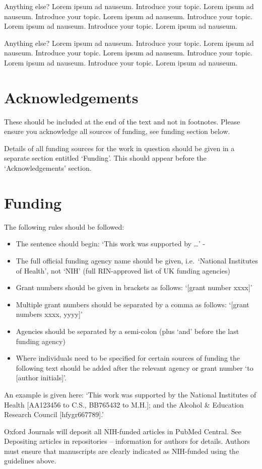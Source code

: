 \documentclass{bioinfo}
\providecommand{\tightlist}{%
  \setlength{\itemsep}{0pt}\setlength{\parskip}{0pt}}
\begin{document}
Anything else? Lorem ipsum ad nauseum. Introduce your topic. Lorem ipsum
ad nauseum. Introduce your topic. Lorem ipsum ad nauseum. Introduce your
topic. Lorem ipsum ad nauseum. Introduce your topic. Lorem ipsum ad
nauseum.

Anything else? Lorem ipsum ad nauseum. Introduce your topic. Lorem ipsum
ad nauseum. Introduce your topic. Lorem ipsum ad nauseum. Introduce your
topic. Lorem ipsum ad nauseum. Introduce your topic. Lorem ipsum ad
nauseum.

\section*{Acknowledgements}

These should be included at the end of the text and not in footnotes.
Please ensure you acknowledge all sources of funding, see funding
section below.

Details of all funding sources for the work in question should be given
in a separate section entitled `Funding'. This should appear before the
`Acknowledgements' section.

\section*{Funding}

The following rules should be followed:

\begin{itemize}
\tightlist
\item
  The sentence should begin: `This work was supported by \ldots{}' -
\item
  The full official funding agency name should be given, i.e.~`National
  Institutes of Health', not `NIH' (full RIN-approved list of UK funding
  agencies)
\item
  Grant numbers should be given in brackets as follows: `{[}grant number
  xxxx{]}'
\item
  Multiple grant numbers should be separated by a comma as follows:
  `{[}grant numbers xxxx, yyyy{]}'
\item
  Agencies should be separated by a semi-colon (plus `and' before the
  last funding agency)
\item
  Where individuals need to be specified for certain sources of funding
  the following text should be added after the relevant agency or grant
  number `to {[}author initials{]}'.
\end{itemize}

An example is given here: `This work was supported by the National
Institutes of Health {[}AA123456 to C.S., BB765432 to M.H.{]}; and the
Alcohol \& Education Research Council {[}hfygr667789{]}.'

Oxford Journals will deposit all NIH-funded articles in PubMed Central.
See Depositing articles in repositories -- information for authors for
details. Authors must ensure that manuscripts are clearly indicated as
NIH-funded using the guidelines above.




\end{document}
